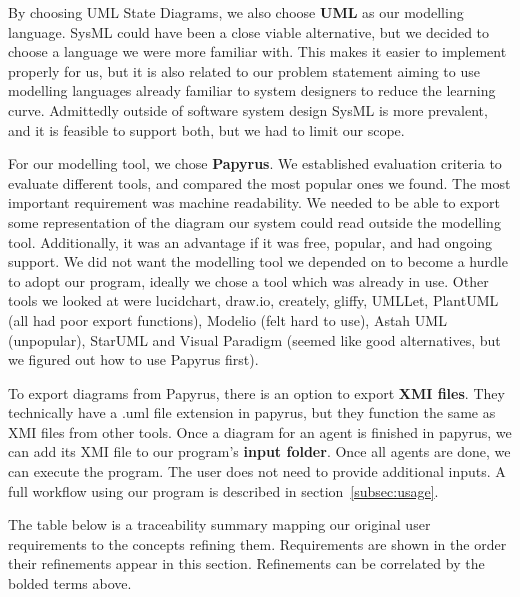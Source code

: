 \documentclass[11pt]{article}
\begin{document}
    By choosing UML State Diagrams, we also choose \textbf{UML} as our modelling language.
    SysML could have been a close viable alternative, but we decided to choose a language we were more familiar with.
    This makes it easier to implement properly for us,
    but it is also related to our problem statement aiming to use modelling languages already familiar to system designers to reduce the learning curve.
    Admittedly outside of software system design SysML is more prevalent, and it is feasible to support both, but we had to limit our scope.

    For our modelling tool, we chose \textbf{Papyrus}.
    We established evaluation criteria to evaluate different tools, and compared the most popular ones we found.
    The most important requirement was machine readability.
    We needed to be able to export some representation of the diagram our system could read outside the modelling tool.
    Additionally, it was an advantage if it was free, popular, and had ongoing support.
    We did not want the modelling tool we depended on to become a hurdle to adopt our program,
    ideally we chose a tool which was already in use.
    Other tools we looked at were lucidchart, draw.io, creately, gliffy, UMLLet, PlantUML (all had poor export functions),
    Modelio (felt hard to use), Astah UML (unpopular),
    StarUML and Visual Paradigm (seemed like good alternatives, but we figured out how to use Papyrus first).

    To export diagrams from Papyrus, there is an option to export \textbf{XMI files}.
    They technically have a .uml file extension in papyrus, but they function the same as XMI files from other tools.
    Once a diagram for an agent is finished in papyrus, we can add its XMI file to our program's \textbf{input folder}.
    Once all agents are done, we can execute the program.
    The user does not need to provide additional inputs.
    A full workflow using our program is described in section~\ref{subsec:usage}.

    The table below is a traceability summary mapping our original user requirements to the concepts refining them.
    Requirements are shown in the order their refinements appear in this section.
    Refinements can be correlated by the bolded terms above.
\end{document}
